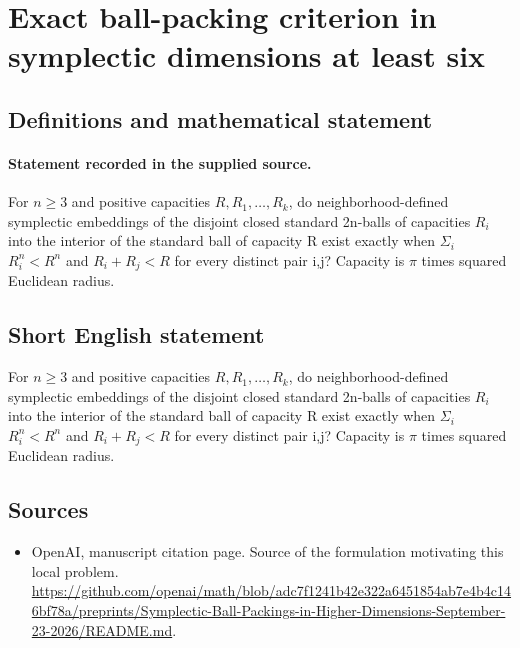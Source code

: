 \documentclass[11pt]{article}
\begin{document}
\section*{Exact ball-packing criterion in symplectic dimensions at least six}\label{statement}
\subsection{Definitions and mathematical statement}
\paragraph{Statement recorded in the supplied source.}
For $n\geq 3$ and positive capacities $R,R_{1},\dots ,R_k$, do neighborhood-defined symplectic embeddings of the disjoint closed standard 2n-balls of capacities $R_i$ into the interior of the standard ball of capacity R exist exactly when $\Sigma _i$ $R_i^{n}<R^{n}$ and $R_i+R_j<R$ for every distinct pair i,j? Capacity is $\pi $ times squared Euclidean radius.
\subsection{Short English statement}
For $n\geq 3$ and positive capacities $R,R_{1},\dots ,R_k$, do neighborhood-defined symplectic embeddings of the disjoint closed standard 2n-balls of capacities $R_i$ into the interior of the standard ball of capacity R exist exactly when $\Sigma _i$ $R_i^{n}<R^{n}$ and $R_i+R_j<R$ for every distinct pair i,j? Capacity is $\pi $ times squared Euclidean radius.
\subsection{Sources}
\begin{itemize}
\item[S1] OpenAI, manuscript citation page. Source of the formulation motivating this local problem.
\url{https://github.com/openai/math/blob/adc7f1241b42e322a6451854ab7e4b4c146bf78a/preprints/Symplectic-Ball-Packings-in-Higher-Dimensions-September-23-2026/README.md}.
\end{itemize}
\end{document}
